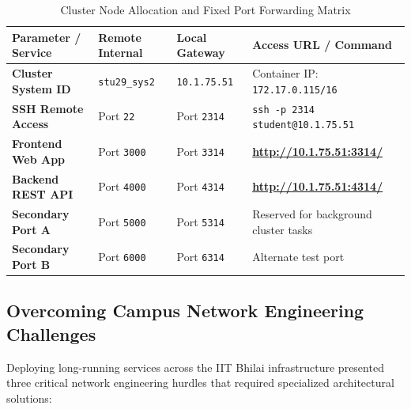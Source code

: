 \documentclass[11pt,a4paper]{article}
\begin{document}
\begin{table}[H]
\centering
\small
\caption{Cluster Node Allocation and Fixed Port Forwarding Matrix}
\label{tab:cluster_node}
\vspace{-0.2cm}
\begin{tabularx}{\linewidth}{lllX}
\toprule
\textbf{Parameter / Service} & \textbf{Remote Internal} & \textbf{Local Gateway} & \textbf{Access URL / Command} \\
\midrule
\textbf{Cluster System ID} & \texttt{stu29\_sys2} & \texttt{10.1.75.51} & Container IP: \texttt{172.17.0.115/16} \\
\textbf{SSH Remote Access} & Port \texttt{22} & Port \texttt{2314} & \texttt{ssh -p 2314 student@10.1.75.51} \\
\textbf{Frontend Web App} & Port \texttt{3000} & Port \texttt{3314} & \textbf{\url{http://10.1.75.51:3314/}} \\
\textbf{Backend REST API} & Port \texttt{4000} & Port \texttt{4314} & \textbf{\url{http://10.1.75.51:4314/}} \\
\textbf{Secondary Port A} & Port \texttt{5000} & Port \texttt{5314} & Reserved for background cluster tasks \\
\textbf{Secondary Port B} & Port \texttt{6000} & Port \texttt{6314} & Alternate test port \\
\bottomrule
\end{tabularx}
\end{table}

\subsection{Overcoming Campus Network Engineering Challenges}
Deploying long-running services across the IIT Bhilai infrastructure presented three critical network engineering hurdles that required specialized architectural solutions:
\end{document}
